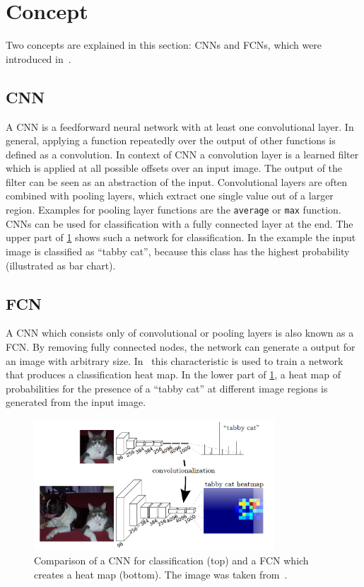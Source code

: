 \section{Concept}\label{sec:concept}
Two concepts are explained in this section: \Glspl{CNN} and \glspl{FCN}, which
were introduced in~\cite{long2014fully}.

\subsection{CNN}
A \gls{CNN} is a feedforward neural network with at least one convolutional
layer. In general, applying a function repeatedly over the output of other
functions is defined as a convolution. In context of \gls{CNN} a convolution
layer is a learned filter which is applied at all possible offsets over an
input image. The output of the filter can be seen as an abstraction of the
input. Convolutional layers are often combined with pooling layers, which
extract one single value out of a larger region. Examples for pooling layer
functions are the \verb+average+ or \verb+max+ function.\\
\gls{CNN}s can be used for classification with a fully connected layer at the
end. The upper part of \cref{fig:fcn} shows such a network
for classification. In the example the input image is classified as
\enquote{tabby cat}, because this class has the highest probability
(illustrated as bar chart).

\subsection{FCN}
A \gls{CNN} which consists only of convolutional or pooling layers is also
known as a \gls{FCN}. By removing fully connected nodes, the network can
generate a output for an image with arbitrary size. In~\cite{long2014fully}
this characteristic is used to train a network that produces a classification
heat map. In the lower part of \cref{fig:fcn}, a heat map of probabilities for
the presence of a \enquote{tabby cat} at different image regions is generated
from the input image.

\begin{figure}[htb]
    \centering
    \includegraphics[width=9cm]{figures/fcnn}
    \caption{Comparison of a \gls{CNN} for classification (top) and a \gls{FCN} which creates a heat map (bottom). The image was taken from~\cite{long2014fully}.}
    \label{fig:fcn}
\end{figure}

